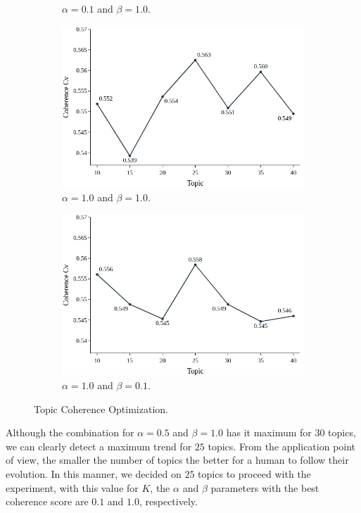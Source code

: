 \begin{figure}[h!]
\begin{subfigure}{0.49\textwidth}
		\caption{$\alpha = 0.1$ and $\beta = 1.0$.} 
	\end{subfigure}%
	\vfill
	\begin{subfigure}{0.49\textwidth}
		\includegraphics[width=\linewidth]{01.Chapters/05.Results/03_Topic_Cv_A:1.0| B:1.00}
		\caption{$\alpha = 1.0$ and $\beta = 1.0$.} 
	\end{subfigure}%
	\hfill
	\begin{subfigure}{0.49\textwidth}
		\includegraphics[width=\linewidth]{01.Chapters/05.Results/04_Topic_Cv_A:1.0| B:0.10}
		\caption{$\alpha = 1.0$ and $\beta = 0.1$.} 
	\end{subfigure}%
	\caption{Topic Coherence Optimization.}
	\label{fig:coherence-optimization}
\end{figure}

Although the combination for $\alpha = 0.5$ and $\beta = 1.0$ has it maximum for $30$ topics, we can clearly detect a maximum trend for $25$ topics. From the application point of view, the smaller the number of topics the better for a human to follow their evolution. In this manner, we decided on $25$ topics to proceed with the experiment, with this value for $K$, the $\alpha$ and $\beta$ parameters with the best coherence score are $0.1$ and $1.0$, respectively.

